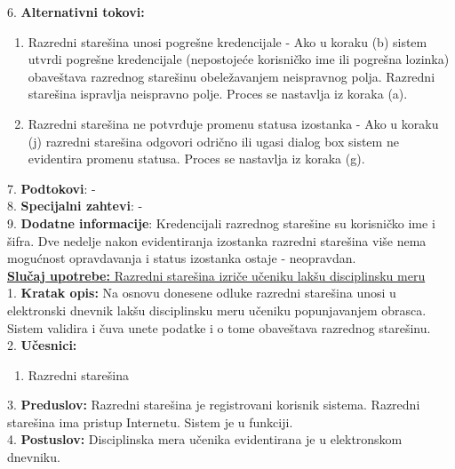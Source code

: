 \documentclass{article}
\begin{document}
6. \textbf{Alternativni tokovi:}
\begin{enumerate} [label=(\roman*)]
\item Razredni starešina unosi pogrešne kredencijale - Ako u koraku (b) sistem utvrdi pogrešne kredencijale (nepostojeće korisničko ime ili pogrešna lozinka) obaveštava razrednog starešinu obeležavanjem neispravnog polja. Razredni starešina ispravlja neispravno polje. Proces se nastavlja iz koraka (a).
\item Razredni starešina ne potvrđuje promenu statusa izostanka - Ako u koraku (j) razredni starešina odgovori odrično ili ugasi dialog box sistem ne evidentira promenu statusa. Proces se nastavlja iz koraka (g). 
\end{enumerate}

7. \textbf{Podtokovi}: - \\

8. \textbf{Specijalni zahtevi}: - \\

9. \textbf{Dodatne informacije}: Kredencijali razrednog starešine su korisničko ime i šifra. Dve nedelje nakon evidentiranja izostanka razredni starešina više nema mogućnost opravdavanja i status izostanka ostaje - neopravdan.\\



\underline{\textbf{Slučaj upotrebe:} Razredni starešina izriče učeniku lakšu disciplinsku meru} \\


1. \textbf{Kratak opis:} Na osnovu donesene odluke razredni starešina unosi u elektronski dnevnik lakšu disciplinsku meru učeniku popunjavanjem obrasca. Sistem validira i čuva unete podatke i o tome obaveštava razrednog starešinu. \\

2. \textbf{Učesnici:}
\begin{enumerate} [label=(\alph*)]
\item Razredni starešina
\end{enumerate} 

3. \textbf{Preduslov:} Razredni starešina je registrovani korisnik sistema. Razredni starešina ima pristup Internetu. Sistem je u funkciji. \\

4. \textbf{Postuslov:} Disciplinska mera učenika evidentirana je u elektronskom dnevniku.\\
\end{document}
